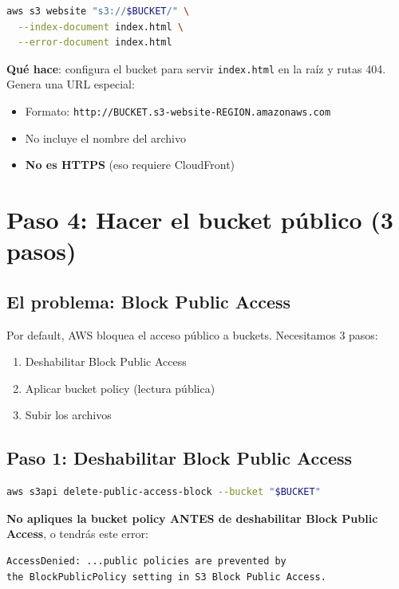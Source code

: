 \documentclass[11pt,a4paper,oneside]{article}
\begin{document}
\begin{lstlisting}[language=bash]
aws s3 website "s3://$BUCKET/" \
  --index-document index.html \
  --error-document index.html
\end{lstlisting}

\textbf{Qu\'e hace}: configura el bucket para servir \texttt{index.html} en la ra\'iz y rutas 404. Genera una URL especial:
\begin{itemize}
  \item Formato: \texttt{http://BUCKET.s3-website-REGION.amazonaws.com}
  \item No incluye el nombre del archivo
  \item \textbf{No es HTTPS} (eso requiere CloudFront)
\end{itemize}

\section{Paso 4: Hacer el bucket p\'ublico (3 pasos)}

\subsection{El problema: Block Public Access}

Por default, AWS bloquea el acceso p\'ublico a buckets. Necesitamos 3 pasos:

\begin{enumerate}
  \item Deshabilitar Block Public Access
  \item Aplicar bucket policy (lectura p\'ublica)
  \item Subir los archivos
\end{enumerate}

\subsection{Paso 1: Deshabilitar Block Public Access}

\begin{lstlisting}[language=bash]
aws s3api delete-public-access-block --bucket "$BUCKET"
\end{lstlisting}

\begin{tcolorbox}[colback=errred!5!white,colframe=errred,title={Trampa \#2: orden de operaciones}]
\textbf{No apliques la bucket policy ANTES de deshabilitar Block Public Access}, o tendr\'as este error:

\begin{lstlisting}
AccessDenied: ...public policies are prevented by
the BlockPublicPolicy setting in S3 Block Public Access.
\end{lstlisting}
\end{tcolorbox}
\end{document}
